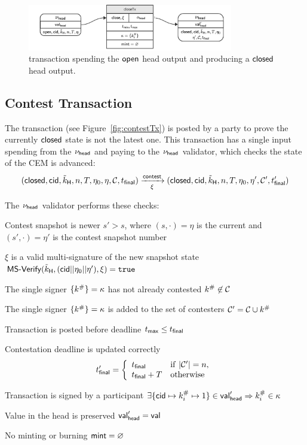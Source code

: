 \begin{figure}[h]
	\centering
	\includegraphics[width=0.8\textwidth]{figures/closeTx.pdf}
	\caption{\mtxClose{} transaction spending the $\mathsf{open}$ head output and producing a $\mathsf{closed}$ head output.}\label{fig:closeTx}
\end{figure}

\subsection{Contest Transaction}\label{sec:contest-tx}

The \mtxContest{} transaction (see Figure~\ref{fig:contestTx}) is posted
by a party to prove the currently $\mathsf{closed}$ state is not the latest one. This
transaction has a single input spending from the $\nu_\mathsf{head}$ and paying to the
$\nu_\mathsf{head}$ validator, which checks the state of the CEM is advanced:
\[
	(\mathsf{closed},\mathsf{cid},\tilde{k}_{\mathsf{H}},n,T,\eta_0,\eta,\mathcal{C},t_{\mathsf{final}}) \xrightarrow[\xi]{\mathsf{contest}} (\mathsf{closed},\mathsf{cid},\tilde{k}_{\mathsf{H}},n,T,\eta_0,\eta',\mathcal{C}',t_{\mathsf{final}}')
\]

\begin{samepage}
	\noindent The $\nu_\mathsf{head}$ validator performs these checks:
	\begin{menumerate}
		\item Contest snapshot is newer $s' > s$, where $(s, \cdot) = \eta$ is the current and $(s', \cdot) = \eta'$ is the contest snapshot number
		\item $\xi$ is a valid multi-signature of the new snapshot state
		$\mathsf{MS\textsf{-}{}Verify}(\tilde{k}_{\mathsf{H}},(\mathsf{cid} || \eta_{0} || \eta'),\xi) = \mathtt{true}$
		\item The single signer $\{k^{\#}\} = \kappa$ has not already contested $k^{\#} \not\in \mathcal{C}$
		\item The single signer $\{k^{\#}\} = \kappa$ is added to the set of contesters $\mathcal{C}' = \mathcal{C} \cup k^{\#}$
		\item Transaction is posted before deadline $t_{\mathsf{max}} \leq t_{\mathsf{final}}$
		\item Contestation deadline is updated correctly
		\[
			t_{\mathsf{final}}' = \left\{\begin{array}{ll}
				t_{\mathsf{final}}     & \mathrm{if} ~ |\mathcal{C}'| = n, \\
				t_{\mathsf{final}} + T & \mathrm{otherwise}
			\end{array}\right.
		\]
		\item Transaction is signed by a participant $\exists \{\mathsf{cid} \mapsto k^{\#}_{i} \mapsto 1\} \in \mathsf{val}_{\mathsf{head}}' \Rightarrow k^{\#}_{i} \in \kappa$
		\item Value in the head is preserved $\mathsf{val}_{\mathsf{head}}' = \mathsf{val}$
		\item No minting or burning $\mathsf{mint} = \varnothing$
	\end{menumerate}
\end{samepage}

